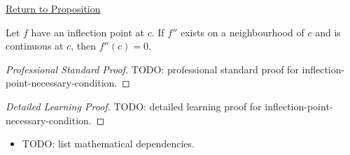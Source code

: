 \newpage
{}
\label{prf:inflection-point-necessary-condition}

\begin{remark*}[Return]
\hyperref[prop:inflection-point-necessary-condition]{Return to Proposition}
\end{remark*}

\begin{proposition*}
Let $f$ have an inflection point at $c$. If $f''$ exists on a neighbourhood of $c$ and is continuous at $c$, then $f''(c)=0$.
\end{proposition*}

\begin{proof}[Professional Standard Proof]
\LRAProofBodyStart
TODO: professional standard proof for inflection-point-necessary-condition.
\end{proof}

\begin{proof}[Detailed Learning Proof]
\LRAProofBodyStart
TODO: detailed learning proof for inflection-point-necessary-condition.
\end{proof}

\begin{remark*}
\end{remark*}

\begin{dependencies}
\begin{itemize}
  \item TODO: list mathematical dependencies.
\end{itemize}
\end{dependencies}

\clearpage

